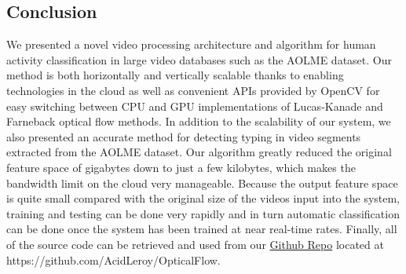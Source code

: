 \subsection{Conclusion}
We presented a novel video processing architecture and algorithm for human
activity classification in large video databases such as the AOLME dataset. Our
method is both horizontally and vertically scalable thanks to enabling
technologies in the cloud as well as convenient APIs provided by OpenCV for easy
switching between CPU and GPU implementations of Lucas-Kanade and Farneback
optical flow methods. In addition to the scalability of our system, we also
presented an accurate method for detecting typing in video segments extracted
from the AOLME dataset. Our algorithm greatly reduced the original feature space
of gigabytes down to just a few kilobytes, which makes the bandwidth limit on
the cloud very manageable. Because the output feature space is quite small
compared with the original size of the videos input into the system, training
and testing can be done very rapidly and in turn automatic classification can be
done once the system has been trained at near real-time rates. Finally, all of
the source code can be retrieved and used from our
\href{https://github.com/AcidLeroy/OpticalFlow}{Github Repo} located at
https://github.com/AcidLeroy/OpticalFlow.
